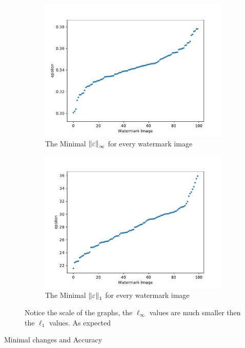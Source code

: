 \documentclass[a4paper]{easychair}
\begin{document}
\begin{figure}
  \centering
  \begin{subfigure}{0.4\linewidth}
    \includegraphics[width=\linewidth]{../data/results/problem3/mnist_w_wm_sorted.pdf}
     \caption{The Minimal $\left\lVert\varepsilon\right\rVert_{\infty}$ for every watermark image}
  	\label{fig:minSingleLP}
  \end{subfigure}
  \begin{subfigure}{0.4\linewidth}
    \includegraphics[width=\linewidth]{../data/results/problem2/mnist_w_wm_sorted.pdf}
    \caption{The Minimal $\left\lVert\varepsilon\right\rVert_1$ for every watermark image}
  	\label{fig:minSingleNotLP}
  \end{subfigure}
  \caption{Notice the scale of the graphs, the $\ell_\infty$ values are much smaller then the $\ell_1$ values. As expected}
\label{fig:minSingle}
\end{figure}
\begin{table}
\caption{Minimal changes and Accuracy}
\label{table:singleWatermark}
\end{table}
\end{document}
